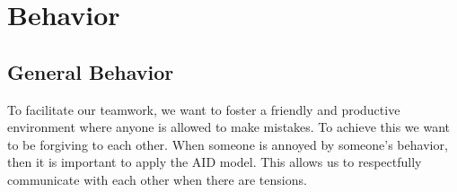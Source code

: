 \section{Behavior}
\subsection{General Behavior}
To facilitate our teamwork, we want to foster a friendly and productive environment where anyone is allowed to make mistakes. To achieve this we want to be forgiving to each other. When someone is annoyed by someone's behavior, then it is important to apply the AID model. This allows us to respectfully communicate with each other when there are tensions.


